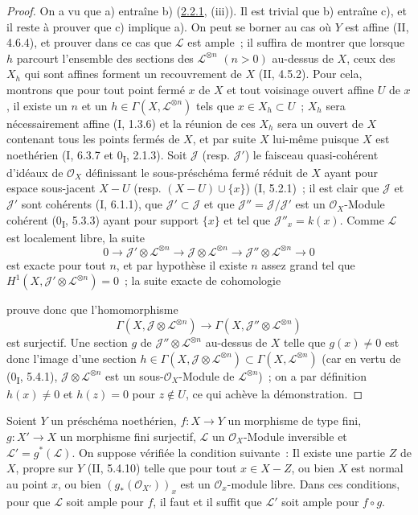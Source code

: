 \begin{proof}
On a vu que a) entraîne b) (\hyperref[III.2.2.1-fr]{2.2.1}, (iii)). Il
est trivial que b) entraîne c), et il reste à prouver que c) implique
a). On peut se borner au cas où $Y$ est affine (II, 4.6.4), et prouver
dans ce cas que $\mathcal L$ est ample~; il suffira de montrer que lorsque
$h$ parcourt l'ensemble des sections des $\mathcal L^{\otimes n}$
$(n>0)$ au-dessus de $X$, ceux des $X_h$ qui sont affines forment un
recouvrement de $X$ (II, 4.5.2). Pour cela, montrons que pour tout point
fermé $x$ de $X$ et tout voisinage ouvert affine $U$ de $x$, il existe un
$n$ et un $h\in\Gamma(X,\mathcal L^{\otimes n})$ tels que
$x\in X_h\subset U$~; $X_h$ sera nécessairement affine (I, 1.3.6) et la
réunion de ces $X_h$ sera un ouvert de $X$ contenant tous les points
fermés de $X$, et par suite $X$ lui-même puisque $X$ est noethérien
(I, 6.3.7 et 0\textsubscript{I}, 2.1.3). Soit $\mathcal J$ (resp.
$\mathcal J'$) le faisceau quasi-cohérent d'idéaux de $\mathcal O_X$
définissant le sous-préschéma fermé réduit de $X$ ayant pour espace
sous-jacent $X-U$ (resp. $(X-U)\cup\{x\}$) (I, 5.2.1)~; il est clair que
$\mathcal J$ et $\mathcal J'$ sont cohérents (I, 6.1.1), que
$\mathcal J'\subset\mathcal J$ et que
$\mathcal J''=\mathcal J/\mathcal J'$ est un $\mathcal O_X$-Module
cohérent (0\textsubscript{I}, 5.3.3) ayant pour support $\{x\}$ et tel
que $\mathcal J''_x=k(x)$. Comme $\mathcal L$ est localement libre, la
suite
\[
0\to\mathcal J'\otimes\mathcal L^{\otimes n}
\to\mathcal J\otimes\mathcal L^{\otimes n}
\to\mathcal J''\otimes\mathcal L^{\otimes n}\to0
\]
est exacte pour tout $n$, et par hypothèse il existe $n$ assez grand tel
que $H^1(X,\mathcal J'\otimes\mathcal L^{\otimes n})=0$~; la suite
exacte de cohomologie

prouve donc que l'homomorphisme
\[
\Gamma(X,\mathcal J\otimes\mathcal L^{\otimes n})
\longrightarrow
\Gamma(X,\mathcal J''\otimes\mathcal L^{\otimes n})
\]
est surjectif. Une section $g$ de
$\mathcal J''\otimes\mathcal L^{\otimes n}$ au-dessus de $X$ telle que
$g(x)\neq0$ est donc l'image d'une section
$h\in\Gamma(X,\mathcal J\otimes\mathcal L^{\otimes n})
\subset\Gamma(X,\mathcal L^{\otimes n})$ (car en vertu de
(0\textsubscript{I}, 5.4.1),
$\mathcal J\otimes\mathcal L^{\otimes n}$ est un sous-$\mathcal O_X$-Module
de $\mathcal L^{\otimes n}$)~; on a par définition $h(x)\neq0$ et
$h(z)=0$ pour $z\notin U$, ce qui achève la démonstration.
\end{proof}

\begin{proposition}[2.6.2]
\label{III.2.6.2-fr}
Soient $Y$ un préschéma noethérien, $f:X\to Y$ un morphisme de type
fini, $g:X'\to X$ un morphisme fini surjectif, $\mathcal L$ un
$\mathcal O_X$-Module inversible et $\mathcal L'=g^*(\mathcal L)$. On
suppose vérifiée la condition suivante~: Il existe une partie $Z$ de
$X$, propre sur $Y$ (II, 5.4.10) telle que pour tout $x\in X-Z$, ou bien
$X$ est normal au point $x$, ou bien $(g_*(\mathcal O_{X'}))_x$ est un
$\mathcal O_x$-module libre. Dans ces conditions, pour que $\mathcal L$
soit ample pour $f$, il faut et il suffit que $\mathcal L'$ soit ample
pour $f\circ g$.
\end{proposition}

